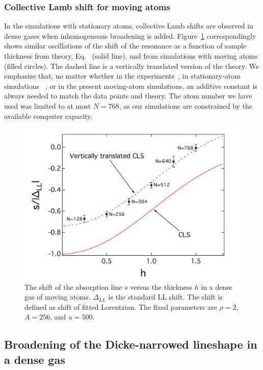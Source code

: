 \subsubsection{Collective Lamb shift for moving atoms}
 
In the simulations with stationary atoms, collective Lamb shifts are observed in dense gases when inhomogeneous broadening is added. Figure~\ref{CLS} correspondingly shows similar oscillations of the shift of the resonance as a function of sample thickness from theory, Eq.~ (solid line), and from simulations with moving atoms (filled circles). The dashed line is a vertically translated version of the theory. We emphasize that, no matter whether in the experiments~\cite{PhysRevLett.108.173601}, in stationary-atom simulations ~\cite{PhysRevLett.112.113603}, or in the present moving-atom simulations, an additive constant is always needed to match the data points and theory.  The atom number we have used was limited to at most $N=768$, as our simulations are constrained by the available computer capacity. 

\begin{figure}[h!]
\begin{center}
\includegraphics[width=\textwidth]{CLS.pdf}
\end{center}
\caption{The shift of the absorption line $s$ versus the thickness $h$ in a dense gas of moving atoms. $\Delta_{LL}$ is the standard LL shift. The shift is defined as shift of fitted Lorentzian.  The fixed parameters are $\rho=2$, $A=256$, and $u=500$.}
\label{CLS}
\end{figure}

\subsection{Broadening of the Dicke-narrowed lineshape in a dense gas}

